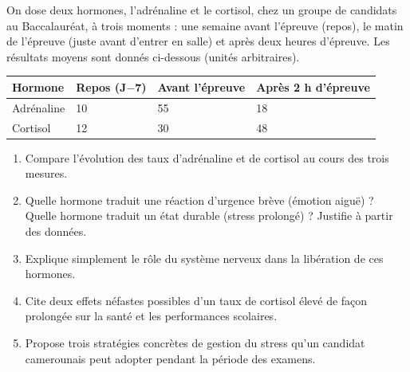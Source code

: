 \documentclass[11pt]{article}
\begin{document}
\begin{exercice}
On dose deux hormones, l'adrénaline et le cortisol, chez un groupe de candidats au Baccalauréat, à trois moments : une semaine avant l'épreuve (repos), le matin de l'épreuve (juste avant d'entrer en salle) et après deux heures d'épreuve. Les résultats moyens sont donnés ci-dessous (unités arbitraires).

\begin{center}
\begin{tabularx}{\linewidth}{|l|X|X|X|}\hline
\rowcolor{popblueL} \textbf{Hormone} & \textbf{Repos (J$-$7)} & \textbf{Avant l'épreuve} & \textbf{Après 2 h d'épreuve} \\ \hline
Adrénaline & 10 & 55 & 18 \\ \hline
Cortisol & 12 & 30 & 48 \\ \hline
\end{tabularx}
\end{center}

\begin{enumerate}
\item Compare l'évolution des taux d'adrénaline et de cortisol au cours des trois mesures.
\item Quelle hormone traduit une réaction d'urgence brève (émotion aiguë) ? Quelle hormone traduit un état durable (stress prolongé) ? Justifie à partir des données.
\item Explique simplement le rôle du système nerveux dans la libération de ces hormones.
\item Cite deux effets néfastes possibles d'un taux de cortisol élevé de façon prolongée sur la santé et les performances scolaires.
\item Propose trois stratégies concrètes de gestion du stress qu'un candidat camerounais peut adopter pendant la période des examens.
\end{enumerate}
\end{exercice}
\end{document}
